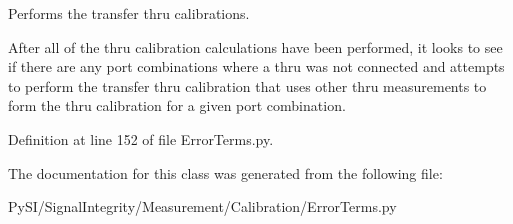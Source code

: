 Performs the transfer thru calibrations. 

After all of the thru calibration calculations have been performed, it looks to see if there are any port combinations where a thru was not connected and attempts to perform the \textquotesingle{}transfer thru\textquotesingle{} calibration that uses other thru measurements to form the thru calibration for a given port combination. 

Definition at line 152 of file Error\+Terms.\+py.



The documentation for this class was generated from the following file\+:\begin{DoxyCompactItemize}
\item 
Py\+S\+I/\+Signal\+Integrity/\+Measurement/\+Calibration/Error\+Terms.\+py\end{DoxyCompactItemize}
